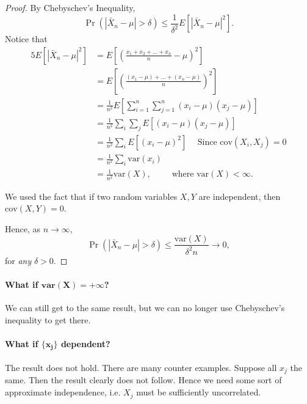 \documentclass[12pt]{article}\usepackage[]{graphicx}\usepackage[]{color}
\begin{document}
\begin{proof}   By Chebyschev's Inequality,
  \[
    \Pr(|\bar{X}_n - \mu| > \delta) \leq \frac{1}{\delta^2} E\left[ |\bar{X}_n - \mu|^2 \right].
  \]
  Notice that
  \begin{alignat*}{5}     
    E\left[ |\bar{X}_n - \mu|^2 \right]
    &= E \left[ \left(\frac{x_1 + x_2 + \ldots + x_n}{n} - \mu \right)^2 \right] \\
    &= E \left[ \left( \frac{(x_1 - \mu) + \ldots + (x_n - \mu)}{n}\right)^2 \right] \\
    &= \frac{1}{n^2} E \left[ \sum_{i=1}^n \sum_{j=1}^n (x_i - \mu) (x_j - \mu) \right] \\
    &= \frac{1}{n^2} \sum_{i} \sum_{j} E \left[ (x_i - \mu) (x_j - \mu)\right] \\
    &= \frac{1}{n^2} \sum_i E[(x_i-\mu)^2] \hspace{15pt} \textrm{Since } \textrm{cov}(X_i,X_j)=0\\
    &= \frac{1}{n^2} \sum_i \textrm{var}(x_i) \\
    &= \frac{1}{n^2} \textrm{var}(X), \hspace{25pt} \textrm{ where } \textrm{var}(X) < \infty. \end{alignat*}

We used the fact that if two random variables $X,Y$ are independent,
then $\textrm{cov}(X,Y) = 0$.

Hence, as $n\longrightarrow \infty$,
\[
\Pr( |\bar{X}_n - \mu| > \delta) \leq \frac{\textrm{var}(X)}{\delta^2 n} \longrightarrow 0,
\]
for \emph{any} $\delta > 0$. \end{proof}

\paragraph{What if $\pmb{\textrm{var}(X) = + \infty}$?} We can still get to the same result, but we can no longer use Chebyschev's inequality to get there.

\paragraph{What if $\pmb{\{x_j\}}$ dependent?} The result does not hold. There are many counter examples. Suppose all $x_j$ the same. Then the result clearly
does not follow. Hence we need some sort of approximate independence,
i.e. $X_j$ must be sufficiently uncorrelated.
\end{document}
